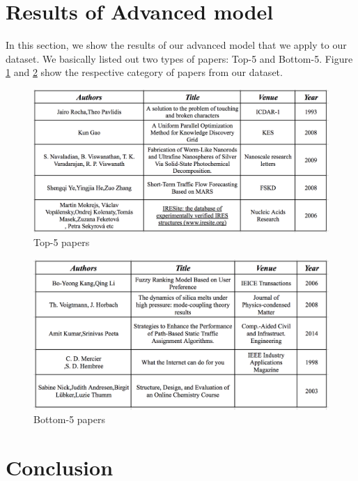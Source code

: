 \documentclass[a4paper, 11pt]{article}
\begin{document}
\section{Results of Advanced model}
In this section, we show the results of our advanced model that we apply to our dataset. We basically listed out two types of papers: Top-5 and Bottom-5. Figure \ref{fig:top_five} and \ref{fig:bottom_five} show the respective category of papers from our dataset.

\begin{figure}[!htb] 
%
  \includegraphics[width=\linewidth]{top_five.png}
   \caption{Top-5 papers}
     \label{fig:top_five}
\endminipage
\end{figure}

\begin{figure}[!htb] 
%
  \includegraphics[width=\linewidth]{bottom_five.png}
   \caption{Bottom-5 papers}
  \label{fig:bottom_five}
\endminipage
\end{figure}


\section{Conclusion}
\end{document}
